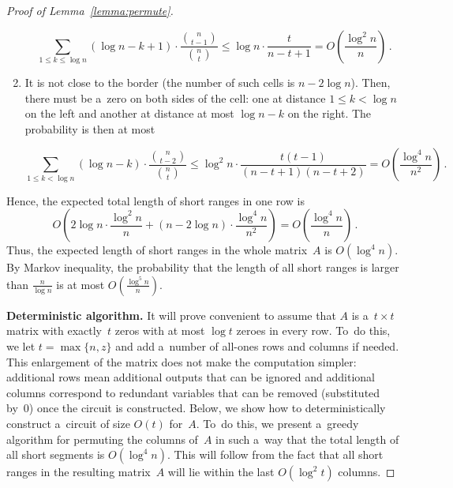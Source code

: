 \begin{proof}[Proof of Lemma~\ref{lemma:permute}]
\begin{enumerate}
\[\sum_{1 \le k \le \log n}(\log n - k + 1) \cdot \frac{\binom{n}{t-1}}{\binom{n}{t}} \le \log n \cdot \frac{t}{n-t+1}=O\left(\frac{\log^2n}{n}\right) \, .\]

\item It is not close to the border (the number of such cells is $n-2\log n$).
Then, there must be a~zero on both sides of the cell: one at
distance $1 \le k < \log n$ on the left and another at distance at most
$\log n - k$ on the right. The probability is then at most

\[\sum_{1 \le k < \log n}(\log n - k) \cdot \frac{\binom{n}{t-2}}{\binom{n}{t}} \le \log^2n \cdot \frac{t(t-1)}{(n-t+1)(n-t+2)}=O\left(\frac{\log^4 n}{n^2}\right) \, .\]

\end{enumerate}
Hence, the expected total length of short ranges in one row is
\[O\left( 2\log n \cdot \frac{\log^2 n}{n} + (n-2\log n) \cdot \frac{\log^4 n}{n^2}\right)=O\left(\frac{\log^4 n}{n}\right) \, .\]
Thus, the expected length of short ranges in the whole
matrix~$A$ is $O(\log^4n)$. By Markov inequality, the probability that
the length of all short ranges is larger than $\frac{n}{\log n}$ is
at most $O(\frac{\log^5 n}{n})$.

\textbf{Deterministic algorithm.}
It will prove convenient to assume that $A$ is a~$t \times t$ matrix with
exactly~$t$ zeros with at most $\log t$ zeroes in every row. To~do this, we let
$t=\max\{n, z\}$ and add a~number of all-ones rows and columns if needed. This
enlargement of the matrix does not make the computation simpler: additional rows
mean additional outputs that can be ignored and additional columns correspond to
redundant variables that can be removed (substituted by~0) once the circuit is
constructed. Below, we show how to deterministically construct a~circuit of size
$O(t)$ for~$A$. To~do this, we present a~greedy algorithm for permuting the
columns of~$A$ in such a~way that the total length of all short segments
is $O(\log^4n)$. This will follow from the fact that all short ranges in the
resulting matrix~$A$ will lie within the last $O(\log^2 t)$ columns.



\end{proof}
